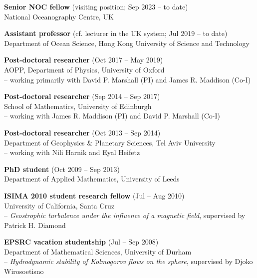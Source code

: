 \documentclass[letterpaper]{article}
\renewenvironment{itemize}{
  \begin{list}{}{
    \setlength{\leftmargin}{1.5em}
  }
}{
  \end{list}
}
\begin{document}
\begin{itemize}

\item \textbf{Senior NOC fellow} (visiting position; Sep 2023 -- to date)\\
National Oceanography Centre, UK

\item \textbf{Assistant professor} (cf. lecturer in the UK system; Jul 2019 -- to date)\\
Department of Ocean Science, Hong Kong University of Science and Technology

\item \textbf{Post-doctoral researcher} (Oct 2017 -- May 2019)\\
AOPP, Department of Physics, University of Oxford\\
-- working primarily with David P. Marshall (PI) and James R. Maddison (Co-I) 

\item \textbf{Post-doctoral researcher} (Sep 2014 -- Sep 2017)\\
School of Mathematics, University of Edinburgh\\
-- working with James R. Maddison (PI) and David P. Marshall (Co-I)

\item \textbf{Post-doctoral researcher} (Oct 2013 -- Sep 2014)\\
Department of Geophysics \& Planetary Sciences, Tel Aviv University\\
-- working with Nili Harnik and Eyal Heifetz

\item \textbf{PhD student}  (Oct 2009 -- Sep 2013)\\
Department of Applied Mathematics, University of Leeds
	
\item \textbf{ISIMA 2010 student research fellow} (Jul -- Aug 2010)\\
University of California, Santa Cruz\\
-- \textit{Geostrophic turbulence under the influence of a magnetic field},
supervised by Patrick H. Diamond
	
\item \textbf{EPSRC vacation studentship} (Jul -- Sep 2008)\\
Department of Mathematical Sciences, University of Durham\\
-- \textit{Hydrodynamic stability of Kolmogorov flows on the sphere},
supervised by Djoko Wirosoetisno
	
\end{itemize}
\end{document}
